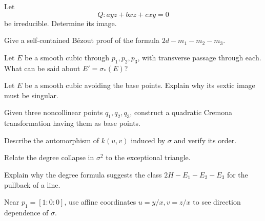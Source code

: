 \begin{problem}\label{prob:vi44-04}
Let
\[
 Q:a yz+b xz+c xy=0
\]
be irreducible.  Determine its image.
\end{problem}

\begin{problem}\label{prob:vi44-05}
Give a self-contained B\'ezout proof of the formula \(2d-m_1-m_2-m_3\).
\end{problem}

\begin{problem}\label{prob:vi44-06}
Let \(E\) be a smooth cubic through \(p_1,p_2,p_3\), with transverse passage through each.  What can be said about \(E'=\sigma_*(E)\)?
\end{problem}

\begin{problem}\label{prob:vi44-07}
Let \(E\) be a smooth cubic avoiding the base points.  Explain why its sextic image must be singular.
\end{problem}

\begin{problem}\label{prob:vi44-08}
Given three noncollinear points \(q_1,q_2,q_3\), construct a quadratic Cremona transformation having them as base points.
\end{problem}

\begin{problem}\label{prob:vi44-09}
Describe the automorphism of \(k(u,v)\) induced by \(\sigma\) and verify its order.
\end{problem}

\begin{problem}\label{prob:vi44-10}
Relate the degree collapse in \(\sigma^2\) to the exceptional triangle.
\end{problem}

\begin{problem}\label{prob:vi44-11}
Explain why the degree formula suggests the class \(2H-E_1-E_2-E_3\) for the pullback of a line.
\end{problem}

\begin{problem}\label{prob:vi44-12}
Near \(p_1=[1:0:0]\), use affine coordinates \(u=y/x,v=z/x\) to see direction dependence of \(\sigma\).
\end{problem}

